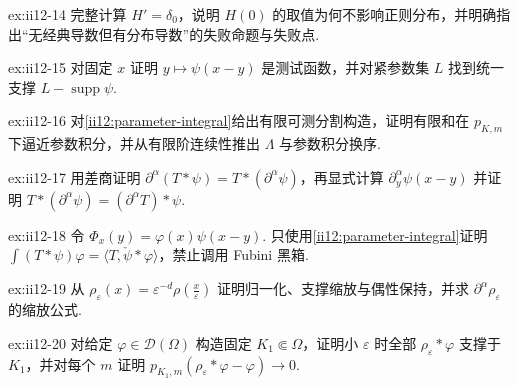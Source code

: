 \begin{FAExercise}{ex:ii12-14}
完整计算 \(\displaystyle H'=\delta_0\)，说明 \(\displaystyle H(0)\) 的取值为何不影响正则分布，并明确指出“无经典导数但有分布导数”的失败命题与失败点.
\end{FAExercise}

\begin{FAExercise}[分布与测试函数卷积]{ex:ii12-15}
对固定 \(\displaystyle x\) 证明 \(\displaystyle y\mapsto\psi(x-y)\) 是测试函数，并对紧参数集 \(\displaystyle L\) 找到统一支撑 \(\displaystyle L-\operatorname{supp}\psi\).
\end{FAExercise}

\begin{FAExercise}[参数积分换序]{ex:ii12-16}
对\autoref{ii12:parameter-integral}给出有限可测分割构造，证明有限和在 \(\displaystyle p_{K,m}\) 下逼近参数积分，并从有限阶连续性推出 \(\displaystyle\Lambda\) 与参数积分换序.
\end{FAExercise}

\begin{FAExercise}[卷积导数符号]{ex:ii12-17}
用差商证明 \(\displaystyle\partial^\alpha(T*\psi)=T*(\partial^\alpha\psi)\)，再显式计算 \(\displaystyle\partial_y^\alpha\psi(x-y)\) 并证明 \(\displaystyle T*(\partial^\alpha\psi)=(\partial^\alpha T)*\psi\).
\end{FAExercise}

\begin{FAExercise}[卷积配对恒等式]{ex:ii12-18}
令 \(\displaystyle\Phi_x(y)=\varphi(x)\psi(x-y)\). 只使用\autoref{ii12:parameter-integral}证明 \(\displaystyle\int(T*\psi)\varphi=\langle T,\check\psi*\varphi\rangle\)，禁止调用 Fubini 黑箱.
\end{FAExercise}

\begin{FAExercise}[磨光核缩放]{ex:ii12-19}
从 \(\displaystyle\rho_\varepsilon(x)=\varepsilon^{-d}\rho(\frac{x}{\varepsilon})\) 证明归一化、支撑缩放与偶性保持，并求 \(\displaystyle\partial^\alpha\rho_\varepsilon\) 的缩放公式.
\end{FAExercise}

\begin{FAExercise}[测试函数近似恒等式]{ex:ii12-20}
对给定 \(\displaystyle\varphi\in\mathcal D(\Omega)\) 构造固定 \(\displaystyle K_1\Subset\Omega\)，证明小 \(\displaystyle\varepsilon\) 时全部 \(\displaystyle\rho_\varepsilon*\varphi\) 支撑于 \(\displaystyle K_1\)，并对每个 \(\displaystyle m\) 证明 \(\displaystyle p_{K_1,m}(\rho_\varepsilon*\varphi-\varphi)\to0\).
\end{FAExercise}

